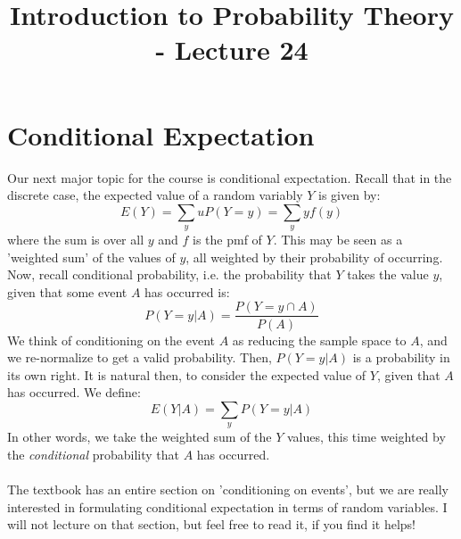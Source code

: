 \documentclass[12pt]{article} %
\date{}
\title{Introduction to Probability Theory - Lecture 24}
\begin{document}
\maketitle

\section{Conditional Expectation}
Our next major topic for the course is conditional expectation. Recall that in the discrete case, the expected value of a random variably $Y$ is given by:
$$E(Y) = \sum_y u P(Y=y) = \sum_y y f(y)$$
where the sum is over all $y$ and $f$ is the pmf of $Y$. This may be seen as a 'weighted sum' of the values of $y$, all weighted by their probability of occurring.  Now, recall conditional probability, i.e. the probability that $Y$ takes the value $y$, given that some event $A$ has occurred is:
$$P(Y=y|A) = \frac{P(Y=y \cap A)}{P(A)}$$
We think of conditioning on the event $A$ as reducing the sample space to $A$, and we re-normalize to get a valid probability. Then, $P(Y=y|A)$ is a probability in its own right. It is natural then, to consider the expected value of $Y$, given that $A$ has occurred. We define:
$$E(Y|A) = \sum_y P(Y=y|A)$$
In other words, we take the weighted sum of the $Y$ values, this time weighted by the \emph{conditional} probability that $A$ has occurred.\\\\
The textbook has an entire section on 'conditioning on events', but we are really interested in formulating conditional expectation in terms of random variables. I will not lecture on that section, but feel free to read it, if you find it helps!\\\\
\end{document}
